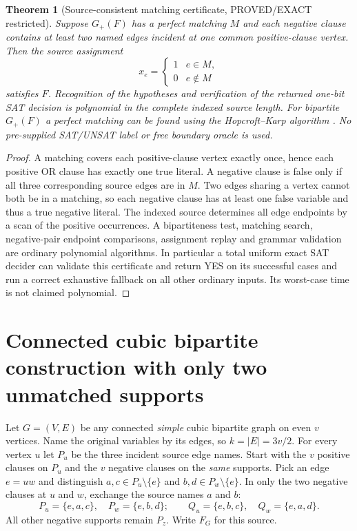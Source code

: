\documentclass[11pt]{article}
\newtheorem{theorem}{Theorem}
\begin{document}
\begin{theorem}[Source-consistent matching certificate, PROVED/EXACT restricted]
Suppose $G_+(F)$ has a perfect matching $M$ and each negative clause contains at least two named edges incident at one common positive-clause vertex. Then the source assignment
\[
x_e=\begin{cases}1&e\in M,\\0&e\notin M\end{cases}
\]
satisfies $F$. Recognition of the hypotheses and verification of the returned one-bit SAT decision is polynomial in the complete indexed source length. For bipartite $G_+(F)$ a perfect matching can be found using the Hopcroft--Karp algorithm \cite{hopcroft}. No pre-supplied SAT/UNSAT label or free boundary oracle is used.
\end{theorem}
\begin{proof}
A matching covers each positive-clause vertex exactly once, hence each positive OR clause has exactly one true literal. A negative clause is false only if all three corresponding source edges are in $M$. Two edges sharing a vertex cannot both be in a matching, so each negative clause has at least one false variable and thus a true negative literal. The indexed source determines all edge endpoints by a scan of the positive occurrences. A bipartiteness test, matching search, negative-pair endpoint comparisons, assignment replay and grammar validation are ordinary polynomial algorithms. In particular a total uniform exact SAT decider can validate this certificate and return YES on its successful cases and run a correct exhaustive fallback on all other ordinary inputs. Its worst-case time is not claimed polynomial.
\end{proof}

\section{Connected cubic bipartite construction with only two unmatched supports}
Let $G=(V,E)$ be any connected \emph{simple} cubic bipartite graph on even $v$ vertices. Name the original variables by its edges, so $k=|E|=3v/2$. For every vertex $u$ let $P_u$ be the three incident source edge names. Start with the $v$ positive clauses on $P_u$ and the $v$ negative clauses on the \emph{same} supports. Pick an edge $e=uw$ and distinguish $a,c\in P_u\setminus\{e\}$ and $b,d\in P_w\setminus\{e\}$. In only the two negative clauses at $u$ and $w$, exchange the source names $a$ and $b$:
\[
P_u=\{e,a,c\},\quad P_w=\{e,b,d\};
\qquad
Q_u=\{e,b,c\},\quad Q_w=\{e,a,d\}.
\]
All other negative supports remain $P_z$. Write $F_G$ for this source.
\end{document}
